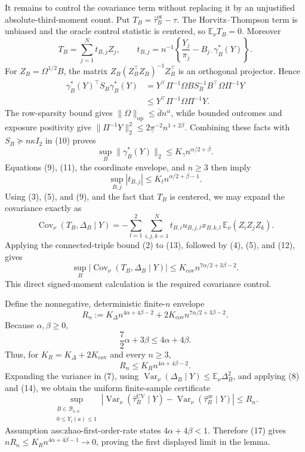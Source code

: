 It remains to control the covariance term without replacing it by an unjustified absolute-third-moment count.  Put \(T_B=\widehat\tau_B^{\mathrm{or}}-\tau\).  The Horvitz--Thompson term is unbiased and the oracle control statistic is centered, so \(\mathbb E_\nu T_B=0\).  Moreover
\[
 T_B=\sum_{j=1}^{N}t_{B,j}Z_j,
 \qquad
 t_{B,j}=n^{-1}\left\{\frac{Y_j}{\pi_j}-B_{j\cdot}\gamma_B^*(Y)\right\}.
 \tag{9}
\]
For \(Z_B=\Omega^{1/2}B\), the matrix \(Z_B(Z_B^\top Z_B)^{-1}Z_B^\top\) is an orthogonal projector.  Hence
\[
 \begin{aligned}
 \gamma_B^*(Y)^\top S_B\gamma_B^*(Y)
 &=Y^\top\Pi^{-1}\Omega B S_B^{-1}B^\top\Omega\Pi^{-1}Y\\
 &\leq Y^\top\Pi^{-1}\Omega\Pi^{-1}Y.
 \end{aligned}
 \tag{10}
\]
The row-sparsity bound gives \(\lVert\Omega\rVert_{\mathrm{op}}\leq\overline d n^\alpha\), while bounded outcomes and exposure positivity give \(\lVert\Pi^{-1}Y\rVert_2^2\leq2\underline\pi^{-2}n^{1+2\beta}\).  Combining these facts with \(S_B\succeq n\kappa I_2\) in (10) proves
\[
 \sup_B\lVert\gamma_B^*(Y)\rVert_2
 \leq K_\gamma n^{\alpha/2+\beta}.
 \tag{11}
\]
Equations (9), (11), the coordinate envelope, and \(n\geq3\) then imply
\[
 \sup_{B,j}|t_{B,j}|
 \leq K_t n^{\alpha/2+\beta-1}.
 \tag{12}
\]
Using (3), (5), and (9), and the fact that \(T_B\) is centered, we may expand the covariance exactly as
\[
 \operatorname{Cov}_\nu(T_B,\Delta_B\mid Y)
 =-\sum_{l=1}^{2}\sum_{i,j,k=1}^{N}
 t_{B,i}u_{B,j,l}x_{B,k,l}\,
 \mathbb E_\nu(Z_iZ_jZ_k).
 \tag{13}
\]
Applying the connected-triple bound (2) to (13), followed by (4), (5), and (12), gives
\[
 \sup_B\left|\operatorname{Cov}_\nu(T_B,\Delta_B\mid Y)\right|
 \leq K_{\mathrm{cov}}n^{7\alpha/2+3\beta-2}.
 \tag{14}
\]
This direct signed-moment calculation is the required covariance control.

Define the nonnegative, deterministic finite-\(n\) envelope
\[
 R_n
 :=K_\Delta n^{4\alpha+4\beta-2}
 +2K_{\mathrm{cov}}n^{7\alpha/2+3\beta-2}.
 \tag{15}
\]
Because \(\alpha,\beta\geq0\),
\[
 \frac{7}{2}\alpha+3\beta
 \leq4\alpha+4\beta.
 \tag{16}
\]
Thus, for \(K_R=K_\Delta+2K_{\mathrm{cov}}\) and every \(n\geq3\),
\[
 R_n\leq K_Rn^{4\alpha+4\beta-2}.
 \tag{17}
\]
Expanding the variance in (7), using \(\operatorname{Var}_\nu(\Delta_B\mid Y)\leq\mathbb E_\nu\Delta_B^2\), and applying (8) and (14), we obtain the uniform finite-sample certificate
\[
 \sup_{\substack{B\in\mathcal B_{\kappa,\overline a}\\0\leq Y_i(a)\leq1}}
 \left|
 \operatorname{Var}_\nu(\widehat\tau_B^{\mathrm{CV}}\mid Y)
 -\operatorname{Var}_\nu(\widehat\tau_B^{\mathrm{or}}\mid Y)
 \right|
 \leq R_n.
 \tag{18}
\]
Assumption ass:zhao-first-order-rate states \(4\alpha+4\beta<1\).  Therefore (17) gives \(nR_n\leq K_Rn^{4\alpha+4\beta-1}\to0\), proving the first displayed limit in the lemma.


